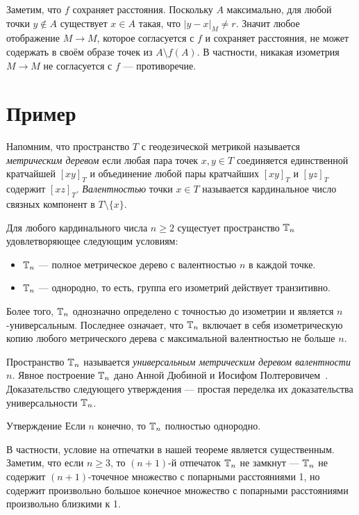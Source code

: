 \documentclass[a4paper,10pt]{article}
\begin{document}
Заметим, что $f$ сохраняет расстояния.
Поскольку $A$ максимально, для любой точки $y\notin A$ существует $x\in A$ такая, что $|y-x|_M\ne r$.
Значит любое отображение $M\to M$, которое согласуется с $f$ и сохраняет расстояния, не может содержать в своём образе точек из $A\setminus f(A)$.
В частности, никакая изометрия $M\to M$ не согласуется с $f$ --- противоречие.
\qeds

\section{Пример}

Напомним, что пространство $T$ с геодезической метрикой называется \emph{метрическим деревом} если любая пара точек $x,y\in T$ соединяется единственной кратчайшей $[xy]_T$ и объединение любой пары кратчайших $[xy]_T$ и $[yz]_T$ содержит $[xz]_T$.
\emph{Валентностью} точки $x\in T$ называется кардинальное число связных компонент в $T\setminus\{x\}$.

Для любого кардинального числа $n\ge 2$ сущестует пространство $\mathbb{T}_n$ удовлетворяющее следующим условиям:
\begin{itemize}
\item $\mathbb{T}_n$ --- полное метрическое дерево с валентностью $n$ в каждой точке.
\item $\mathbb{T}_n$ --- однородно, то есть, группа его изометрий действует транзитивно. 
\end{itemize}
Более того, $\mathbb{T}_n$ однозначно определено с точностью до изометрии и является $n$-универсальным.
Последнее означает, что $\mathbb{T}_n$ включает в себя изометрическую копию любого метрического дерева с максимальной валентностью не больше $n$.

Пространство $\mathbb{T}_n$ называется \emph{универсальным метрическим деревом валентности $n$}.
Явное построение $\mathbb{T}_n$ дано Анной Дюбиной и Иосифом Полтеровичем~\cite{dyubina-polterovich}.
Доказательство следующего утверждения --- простая переделка их доказательства универсальности $\mathbb{T}_n$.

\begin{thm}{Утверждение}
Если $n$ конечно, то $\mathbb{T}_n$ полностью однородно.
\end{thm}

В частности, условие на отпечатки в нашей теореме является существенным.
Заметим, что если $n\ge 3$, то $(n+1)$-й отпечаток $\mathbb{T}_n$ не замкнут --- $\mathbb{T}_n$ не содержит $(n+1)$-точечное множество с попарными расстояниями 1, 
но содержит произвольно большое конечное множество с  попарными расстояниями произвольно близкими к 1.
\end{document}
